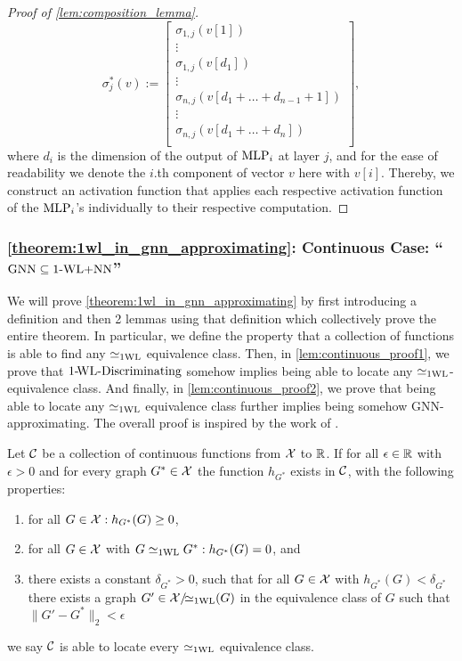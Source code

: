 \begin{proof}[Proof of \cref{lem:composition_lemma}]
\begin{equation*}
        \sigma^*_j(v) := \begin{bmatrix}
            \sigma_{1,j}(v[1])\\
            \vdots\\
            \sigma_{1,j}(v[d_1])\\
            \vdots\\
            \sigma_{n,j}(v[d_1 + \dots + d_{n-1} + 1])\\
            \vdots\\
            \sigma_{n,j}(v[d_1 + \dots + d_n])\\
        \end{bmatrix},
    \end{equation*}
    where $d_i$ is the dimension of the output of $\text{MLP}_i$ at layer $j$, and for the ease of readability we denote the $i$.th component of vector $v$ here with $v[i]$. Thereby, we construct an activation function that applies each respective activation function of the $\text{MLP}_i$'s individually to their respective computation.
\end{proof}


\subsubsection{\autoref{theorem:1wl_in_gnn_approximating}: Continuous Case: ``$\text{GNN} \subseteq \text{1-WL+NN}$''}\label{app:gnn_in_wlnn}
We will prove \autoref{theorem:1wl_in_gnn_approximating} by first introducing a definition and then 2 lemmas using that definition which collectively prove the entire theorem. In particular, we define the property that a collection of functions is able to find any $\simeq_{\text{1WL}}$ equivalence class. Then, in \autoref{lem:continuous_proof1}, we prove that $\text{1-\!WL-Discriminating}$ somehow implies being able to locate any $\simeq_{\text{1WL}}$-equivalence class. And finally, in \autoref{lem:continuous_proof2}, we prove that being able to locate any $\simeq_{\text{1WL}}$ equivalence class further implies being somehow GNN-approximating. The overall proof is inspired by the work of \cite{Chen2019}.

\begin{definition}
    Let $\mathcal{C}$ be a collection of continuous functions from $\mathcal{X}$ to $\mathbb{R}$. If for all $\epsilon \in \mathbb{R}$ with $\epsilon > 0$ and for every graph $G^* \in \mathcal{X}$ the function $h_{G^*}$ exists in $\mathcal{C}$, with the following properties:
    \begin{enumerate}
        \item for all $G \in \mathcal{X}:  h_{G^*}(G) \geq 0$,
        \item for all $G \in \mathcal{X}$ with $G \simeq_{\text{1WL}} G^*: h_{G^*}(G)=0$, and
        \item there exists a constant $\delta_{G^*} > 0$, such that for all $G \in \mathcal{X}$ with $h_{G^*}(G) < \delta_{G^*}$ there exists a graph $G' \in \mathcal{X}/\!{\simeq_{\text{1WL}}}(G)$ in the equivalence class of $G$ such that $\| G' - G^* \|_2 < \epsilon$
    \end{enumerate}
    we say $\mathcal{C}$ is able to locate every $\simeq_{\text{1WL}}$ equivalence class.
\end{definition}

